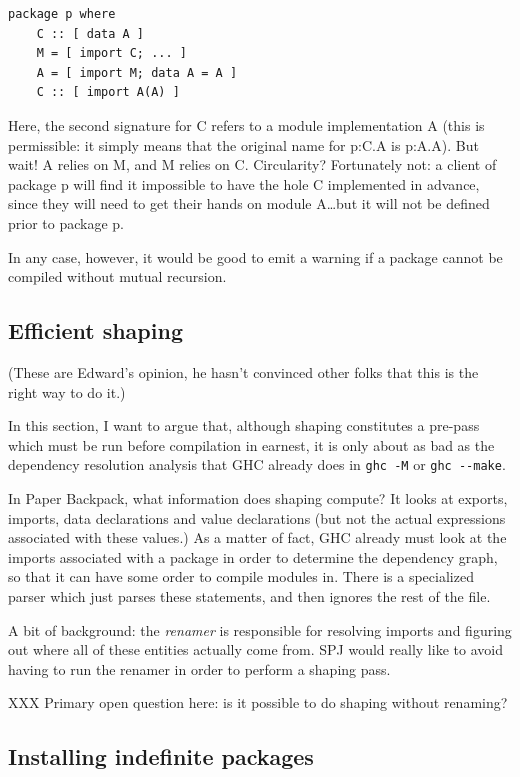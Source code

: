 \documentclass{article}
\begin{document}
\begin{verbatim}
package p where
    C :: [ data A ]
    M = [ import C; ... ]
    A = [ import M; data A = A ]
    C :: [ import A(A) ]
\end{verbatim}

Here, the second signature for C refers to a module implementation A
(this is permissible: it simply means that the original name for p:C.A
is p:A.A).  But wait! A relies on M, and M relies on C. Circularity?
Fortunately not: a client of package p will find it impossible to have
the hole C implemented in advance, since they will need to get their hands on module
A\ldots but it will not be defined prior to package p.

In any case, however, it would be good to emit a warning if a package
cannot be compiled without mutual recursion.

\subsection{Efficient shaping}

(These are Edward's opinion, he hasn't convinced other folks that this is
the right way to do it.)

In this section, I want to argue that, although shaping constitutes
a pre-pass which must be run before compilation in earnest, it is only
about as bad as the dependency resolution analysis that GHC already does
in \verb|ghc -M| or \verb|ghc --make|.

In Paper Backpack, what information does shaping compute? It looks at
exports, imports, data declarations and value declarations (but not the
actual expressions associated with these values.)  As a matter of fact,
GHC already must look at the imports associated with a package in order
to determine the dependency graph, so that it can have some order to compile
modules in.  There is a specialized parser which just parses these statements,
and then ignores the rest of the file.

A bit of background: the \emph{renamer} is responsible for resolving
imports and figuring out where all of these entities actually come from.
SPJ would really like to avoid having to run the renamer in order to perform
a shaping pass.

XXX Primary open question here: is it possible to do shaping without renaming?

\subsection{Installing indefinite packages}\label{sec:installing-indefinite}
\end{document}
